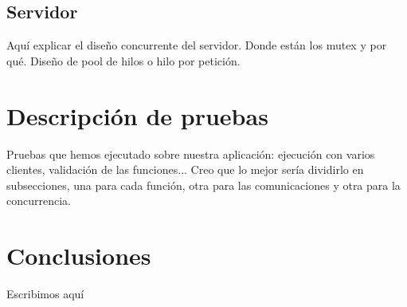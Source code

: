 \documentclass[]{article}
\begin{document}
\subsection{Servidor}
\label{subsec:servidor}
Aquí explicar el diseño concurrente del servidor. Donde están los mutex y por qué. Diseño de pool de hilos o hilo por petición. 

\section{Descripción de pruebas}
\label{sec:descripcion_de_pruebas}
Pruebas que hemos ejecutado sobre nuestra aplicación: ejecución con varios clientes, validación de las funciones... Creo que lo mejor sería dividirlo en subsecciones, una para cada función, otra para las comunicaciones y otra para la concurrencia. 



\section{Conclusiones}
\label{sec:conclusiones}
Escribimos aquí
\end{document}
